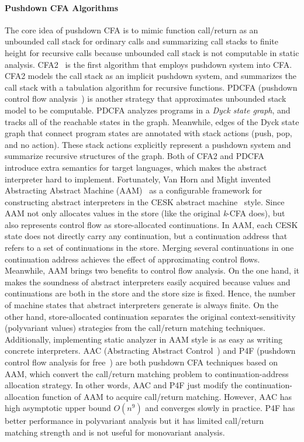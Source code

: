\documentclass[12pt]{report}
\begin{document}
\paragraph{Pushdown CFA Algorithms}
The core idea of pushdown CFA is to mimic function call/return as an unbounded call stack for ordinary calls and summarizing call stacks to finite height for recursive calls because unbounded call stack is not computable in static analysis.
CFA2~\cite{vardoulakis2010cfa2} is the first algorithm that employs pushdown system into CFA\@.
CFA2 models the call stack as an implicit pushdown system, and summarizes the call stack with a tabulation algorithm for recursive functions.
PDCFA (pushdown control flow analysis~\cite{earl2010pushdown})
is another strategy that approximates unbounded stack model to be computable.
PDCFA analyzes programs in a \emph{Dyck state graph}, and tracks all of the reachable states in the graph.
Meanwhile, edges of the Dyck state graph that connect program states are annotated with stack actions (push, pop, and no action).
These stack actions explicitly represent a pushdown system and summarize recursive structures of the graph.
Both of CFA2 and PDCFA introduce extra semantics for target languages, which makes the abstract interpreter hard to implement.
Fortunately, Van Horn and Might
invented Abstracting Abstract Machine (AAM)~\cite{van2010abstracting}
as a configurable framework for constructing abstract interpreters in the CESK abstract machine~\cite{felleisen1987calculus} style.
Since AAM not only allocates values in the store (like the original \textit{k}-CFA does), but also represents control flow as store-allocated continuations.
In AAM, each CESK state does not directly carry any continuation, but a continuation address that refers to a set of continuations in the store.
Merging several continuations in one continuation address achieves the effect of approximating control flows.
Meanwhile, AAM brings two benefits to control flow analysis.
On the one hand, it makes the soundness of abstract interpreters easily acquired because values and continuations are both in the store and
the store size is fixed.
Hence, the number of machine states that abstract interpreters generate is always finite.
On the other hand, store-allocated continuation separates the original context-sensitivity (polyvariant values) strategies from
the call/return matching techniques.
Additionally, implementing static analyzer in AAM style is as easy as writing concrete interpreters.
AAC (Abstracting Abstract Control~\cite{johnson2015abstracting}) and P4F (pushdown control flow analysis for free~\cite{gilray2016pushdown})
are both pushdown CFA techniques based on AAM\@, which convert the call/return matching problem to continuation-address allocation strategy.
In other words, AAC and P4F just modify the continuation-allocation function of AAM to acquire call/return matching.
However, AAC has high asymptotic upper bound $O(n^9)$ and converges slowly in practice. %
P4F has better performance in polyvariant analysis but it has limited call/return matching strength
and is not useful for monovariant analysis.
\end{document}
